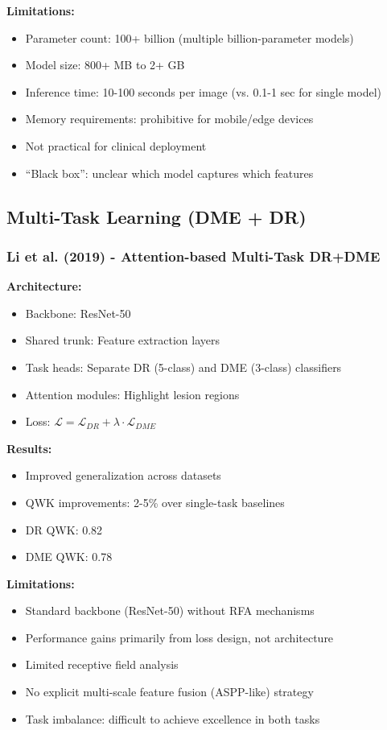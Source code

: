 \documentclass[12pt,a4paper]{article}
\begin{document}
\textbf{Limitations:}
\begin{itemize}
    \item Parameter count: 100+ billion (multiple billion-parameter models)
    \item Model size: 800+ MB to 2+ GB
    \item Inference time: 10-100 seconds per image (vs. 0.1-1 sec for single model)
    \item Memory requirements: prohibitive for mobile/edge devices
    \item Not practical for clinical deployment
    \item ``Black box'': unclear which model captures which features
\end{itemize}

\subsection{Multi-Task Learning (DME + DR)}

\subsubsection{Li et al. (2019) - Attention-based Multi-Task DR+DME}

\textbf{Architecture:}
\begin{itemize}
    \item Backbone: ResNet-50
    \item Shared trunk: Feature extraction layers
    \item Task heads: Separate DR (5-class) and DME (3-class) classifiers
    \item Attention modules: Highlight lesion regions
    \item Loss: $\mathcal{L} = \mathcal{L}_{DR} + \lambda \cdot \mathcal{L}_{DME}$
\end{itemize}

\textbf{Results:}
\begin{itemize}
    \item Improved generalization across datasets
    \item QWK improvements: 2-5\% over single-task baselines
    \item DR QWK: 0.82
    \item DME QWK: 0.78
\end{itemize}

\textbf{Limitations:}
\begin{itemize}
    \item Standard backbone (ResNet-50) without RFA mechanisms
    \item Performance gains primarily from loss design, not architecture
    \item Limited receptive field analysis
    \item No explicit multi-scale feature fusion (ASPP-like) strategy
    \item Task imbalance: difficult to achieve excellence in both tasks
\end{itemize}
\end{document}
